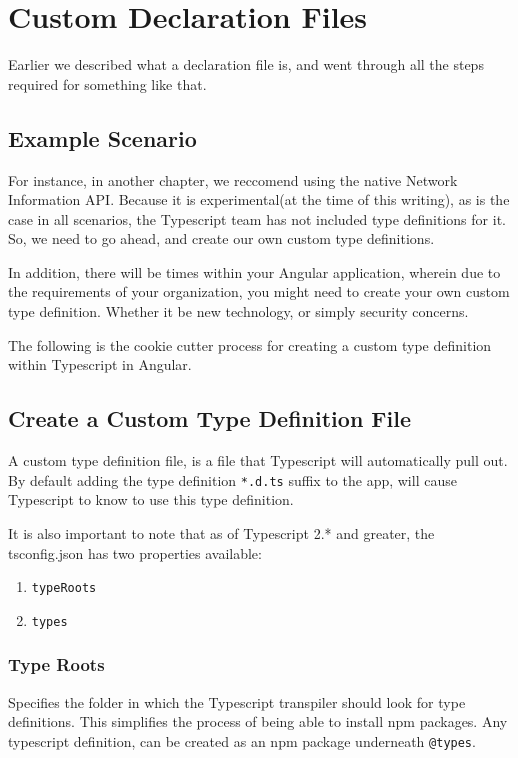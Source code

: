 \chapter{ Custom Declaration Files }
Earlier we described what a declaration file is, and went through all the steps required for something like that.

\section{Example Scenario}
For instance, in another chapter, we reccomend using the native Network 
Information API. Because it is experimental(at the time of this writing),
as is the case in all scenarios, the Typescript team has not included 
type definitions for it. So, we need to go ahead, and create our own 
custom type definitions. 

In addition, there will be times within your Angular application, wherein 
due to the requirements of your organization, you might need to create your 
own custom type definition. Whether it be new technology, or simply security
concerns. 

The following is the cookie cutter process for creating a custom type 
definition within Typescript in Angular. 

\section{Create a Custom Type Definition File}
A custom type definition file, is a file that Typescript will automatically 
pull out. By default adding the type definition \lstinline{*.d.ts} suffix to
the app, will cause Typescript to know to use this type definition.

It is also important to note that as of Typescript 2.* and greater, the
tsconfig.json has two properties available: 
\begin{enumerate}
  \item \lstinline{typeRoots}
  \item \lstinline{types}
\end{enumerate}

\subsection{Type Roots}
Specifies the folder in which the Typescript transpiler should look for type 
definitions. This simplifies the process of being able to install npm packages.
Any typescript definition, can be created as an npm package underneath \lstinline{@types}.

